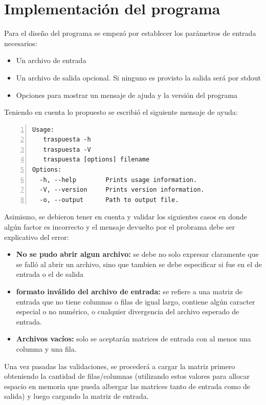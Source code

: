 \documentclass[11pt,a4paper]{article}
\begin{document}
\section{Implementaci\'on del programa}

Para el dise\~no del programa se empez\'o por establecer los par\'ametros de entrada necesarios:

\begin{itemize}
\item Un archivo de entrada
\item Un archivo de salida opcional. Si ninguno es provisto la salida ser\'a por stdout
\item Opciones para mostrar un mensaje de ajuda y la versi\'on del programa
\end{itemize}

Teniendo en cuenta lo propuesto se escribi\'o el siguiente mensaje de ayuda:

\begin{lstlisting}[numbers=left, tabsize=2, basicstyle=\fontsize{11}{13}\ttfamily, frame=single, caption={Mensaje de ayuda del programa}]
Usage:
   traspuesta -h
   traspuesta -V
   traspuesta [options] filename
Options:
  -h, --help        Prints usage information.
  -V, --version     Prints version information.
  -o, --output      Path to output file.

\end{lstlisting}

Asimismo, se debieron tener en cuenta y validar los siguientes casos en donde alg\'un factor es incorrecto y el mensaje devuelto por el probrama debe ser explicativo del error:

\begin{itemize}
\item \textbf{No se pudo abrir algun archivo:} se debe no solo expresar claramente que se fall\'o al abrir un archivo, sino que tambien se debe especificar si fue en el de entrada o el de salida
\item \textbf{formato inv\'alido del archivo de entrada:} se refiere a una matriz de entrada que no tiene columnas o filas de igual largo, contiene alg\'un caracter especial o no num\'erico, o cualquier divergencia del archivo esperado de entrada.
\item \textbf{Archivos vac\'ios:} solo se aceptar\'an matrices de entrada con al menos una colunma y una fila. 
\end{itemize}

Una vez pasadas las validaciones, se proceder\'a a cargar la matriz primero obteniendo la cantidad de filas/columnas (utilizando estos valores para allocar espacio en memoria que pueda albergar las matrices tanto de entrada como de salida) y luego cargando la matriz de entrada.
\end{document}
